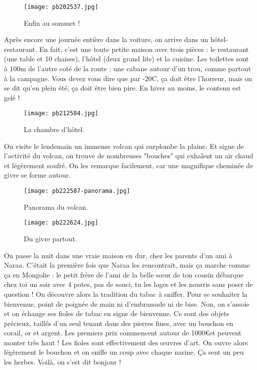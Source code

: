 \documentclass{book}
\begin{document}
\begin{figure}[h]
\centering
\texttt{[image: pb202537.jpg]}
\caption*{ Enfin au sommet !}
\end{figure}

Après encore une journée entière dans la voiture, on arrive dans un hôtel-restaurant. En fait, c'est une toute petite maison avec trois pièces : le restaurant (une table et 10 chaises), l'hôtel (deux grand lits) et la cuisine. Les toilettes sont à 100m de l'autre coté de la route : une cabane autour d'un trou, comme partout à la campagne. Vous devez vous dire que par -20\textdegree C, ça doit être l'horreur, mais on se dit qu'en plein été, ça doit être bien pire. En hiver au moins, le contenu est gelé !


\begin{figure}[h]
\centering
\texttt{[image: pb212584.jpg]}
\caption*{ La chambre d'hôtel.}
\end{figure}

On visite le lendemain un immense volcan qui surplombe la plaine. Et signe de l'activité du volcan, on trouve de nombreuses "bouches" qui exhalent un air chaud et légèrement soufré. On les remarque facilement, car une magnifique cheminée de givre se forme autour.


\begin{figure}[h]
\centering
\texttt{[image: pb222587-panorama.jpg]}
\caption*{ Panorama du volcan.}
\end{figure}


\begin{figure}[h]
\centering
\texttt{[image: pb222624.jpg]}
\caption*{ Du givre partout.}
\end{figure}

On passe la nuit dans une vraie maison en dur, chez les parents d'un ami à Naraa. C'était la première fois que Naraa les rencontrait, mais ça marche comme ça en Mongolie : le petit frère de l'ami de la belle sœur de ton cousin débarque chez toi un soir avec 4 potes, pas de souci, tu les loges et les nourris sans poser de question ! On découvre alors la tradition du tabac à sniffer. Pour se souhaiter la bienvenue, point de poignée de main ni d'embrassade ni de bise. Non, on s'assoie et on échange ses fioles de tabac en signe de bienvenue. Ce sont des objets précieux, taillés d'un seul tenant dans des pierres fines, avec un bouchon en corail, or et argent. Les premiers prix commencent autour de 1000\euro et peuvent monter très haut ! Les fioles sont effectivement des œuvres d'art. On ouvre alors légèrement le bouchon et on sniffe un coup avec chaque narine. Ça sent un peu les herbes. Voilà, on s'est dit bonjour !
\end{document}
